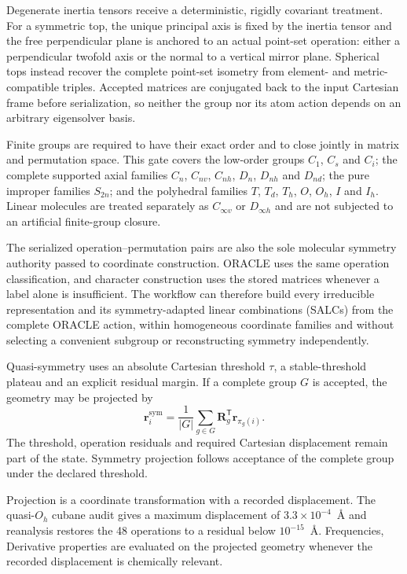 \documentclass[journal=jctcce,manuscript=article]{achemso}
\newcommand{\rev}[1]{#1}
\begin{document}
Degenerate inertia tensors receive a deterministic, rigidly covariant
treatment.  For a symmetric top, the unique principal axis is fixed by the
inertia tensor and the free perpendicular plane is anchored to an actual
point-set operation: either a perpendicular twofold axis or the normal to a
vertical mirror plane.  Spherical tops instead recover the complete point-set
isometry from element- and metric-compatible triples.  Accepted matrices are
conjugated back to the input Cartesian frame before serialization, so neither
the group nor its atom action depends on an arbitrary eigensolver basis.

Finite groups are required to have their exact order and to close jointly in
matrix and permutation space.  This gate covers the low-order groups
$C_1$, $C_s$ and $C_i$; the complete supported axial families
$C_n$, $C_{nv}$, $C_{nh}$, $D_n$, $D_{nh}$ and $D_{nd}$; the pure improper
families $S_{2n}$; and the polyhedral families $T$, $T_d$, $T_h$, $O$, $O_h$,
$I$ and $I_h$.  Linear molecules are treated separately as $C_{\infty v}$ or
$D_{\infty h}$ and are not subjected to an artificial finite-group closure.

The serialized operation--permutation pairs are also the sole molecular
symmetry authority passed to coordinate construction.  ORACLE uses the same operation
classification, and character construction uses the stored matrices whenever
a label alone is insufficient.  The workflow can therefore build every irreducible
representation and its symmetry-adapted linear combinations (SALCs) from the
complete ORACLE action, within homogeneous coordinate families and without
selecting a convenient subgroup or reconstructing symmetry independently.

Quasi-symmetry uses an absolute Cartesian threshold $\tau$, a stable-threshold
plateau and an explicit residual margin.  If a complete group $G$ is accepted,
the geometry may be projected by
\begin{equation}
\mathbf r_i^{\mathrm{sym}}=\frac{1}{|G|}
\sum_{g\in G}\mathbf R_g^\mathsf T\mathbf r_{\pi_g(i)}.
\end{equation}
The threshold, operation residuals and required Cartesian displacement remain
part of the state.  Symmetry projection follows acceptance of the complete
group under the declared threshold.

\rev{Projection is a coordinate transformation with a recorded displacement.  The quasi-$O_h$
cubane audit gives a maximum displacement of $3.3\times10^{-4}$~\AA{} and reanalysis
restores the 48 operations to a residual below $10^{-15}$~\AA{}.  Frequencies,
Derivative properties are evaluated on the projected geometry whenever the
recorded displacement is chemically relevant.}
\end{document}
